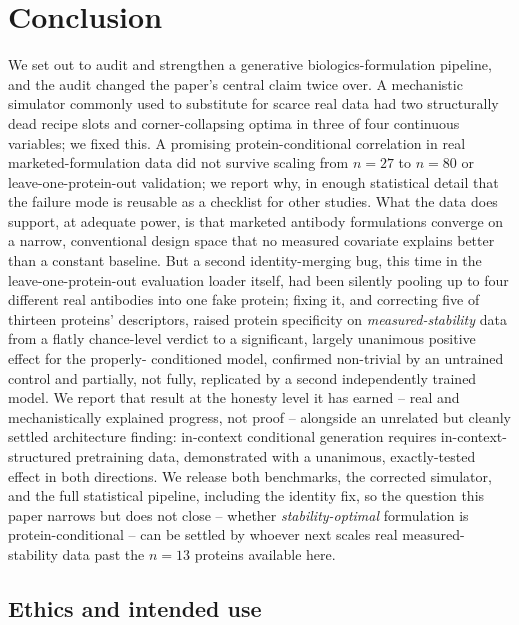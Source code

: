 \documentclass[twocolumn,10pt]{article}
\begin{document}
\section{Conclusion}

We set out to audit and strengthen a generative biologics-formulation pipeline,
and the audit changed the paper's central claim twice over. A mechanistic
simulator commonly used to substitute for scarce real data had two structurally
dead recipe slots and corner-collapsing optima in three of four continuous
variables; we fixed this. A promising protein-conditional correlation in real
marketed-formulation data did not survive scaling from $n=27$ to $n=80$ or
leave-one-protein-out validation; we report why, in enough statistical detail
that the failure mode is reusable as a checklist for other studies. What the
data does support, at adequate power, is that marketed antibody formulations
converge on a narrow, conventional design space that no measured covariate
explains better than a constant baseline. But a second identity-merging bug,
this time in the leave-one-protein-out evaluation loader itself, had been
silently pooling up to four different real antibodies into one fake protein;
fixing it, and correcting five of thirteen proteins' descriptors, raised
protein specificity on \emph{measured-stability} data from a flatly chance-level
verdict to a significant, largely unanimous positive effect for the properly-
conditioned model, confirmed non-trivial by an untrained control and partially,
not fully, replicated by a second independently trained model. We report that
result at the honesty level it has earned -- real and mechanistically explained
progress, not proof -- alongside an unrelated but cleanly settled architecture
finding: in-context conditional generation requires in-context-structured
pretraining data, demonstrated with a unanimous, exactly-tested effect in both
directions. We release both benchmarks, the corrected simulator, and the full
statistical pipeline, including the identity fix, so the question this paper
narrows but does not close -- whether \emph{stability-optimal} formulation is
protein-conditional -- can be settled by whoever next scales real measured-
stability data past the $n=13$ proteins available here.

\subsection*{Ethics and intended use}
\end{document}
